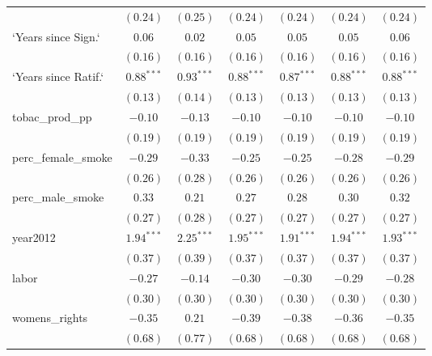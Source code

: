 \begin{table}[!h]
\begin{center}
\begin{tabular}{l c c c c c c }
                        & $(0.24)$     & $(0.25)$     & $(0.24)$     & $(0.24)$     & $(0.24)$     & $(0.24)$     \\
`Years since Sign.`     & $0.06$       & $0.02$       & $0.05$       & $0.05$       & $0.05$       & $0.06$       \\
                        & $(0.16)$     & $(0.16)$     & $(0.16)$     & $(0.16)$     & $(0.16)$     & $(0.16)$     \\
`Years since Ratif.`    & $0.88^{***}$ & $0.93^{***}$ & $0.88^{***}$ & $0.87^{***}$ & $0.88^{***}$ & $0.88^{***}$ \\
                        & $(0.13)$     & $(0.14)$     & $(0.13)$     & $(0.13)$     & $(0.13)$     & $(0.13)$     \\
tobac\_prod\_pp         & $-0.10$      & $-0.13$      & $-0.10$      & $-0.10$      & $-0.10$      & $-0.10$      \\
                        & $(0.19)$     & $(0.19)$     & $(0.19)$     & $(0.19)$     & $(0.19)$     & $(0.19)$     \\
perc\_female\_smoke     & $-0.29$      & $-0.33$      & $-0.25$      & $-0.25$      & $-0.28$      & $-0.29$      \\
                        & $(0.26)$     & $(0.28)$     & $(0.26)$     & $(0.26)$     & $(0.26)$     & $(0.26)$     \\
perc\_male\_smoke       & $0.33$       & $0.21$       & $0.27$       & $0.28$       & $0.30$       & $0.32$       \\
                        & $(0.27)$     & $(0.28)$     & $(0.27)$     & $(0.27)$     & $(0.27)$     & $(0.27)$     \\
year2012                & $1.94^{***}$ & $2.25^{***}$ & $1.95^{***}$ & $1.91^{***}$ & $1.94^{***}$ & $1.93^{***}$ \\
                        & $(0.37)$     & $(0.39)$     & $(0.37)$     & $(0.37)$     & $(0.37)$     & $(0.37)$     \\
labor                   & $-0.27$      & $-0.14$      & $-0.30$      & $-0.30$      & $-0.29$      & $-0.28$      \\
                        & $(0.30)$     & $(0.30)$     & $(0.30)$     & $(0.30)$     & $(0.30)$     & $(0.30)$     \\
womens\_rights          & $-0.35$      & $0.21$       & $-0.39$      & $-0.38$      & $-0.36$      & $-0.35$      \\
                        & $(0.68)$     & $(0.77)$     & $(0.68)$     & $(0.68)$     & $(0.68)$     & $(0.68)$     \\

\end{tabular}
\end{center}
\end{table}
